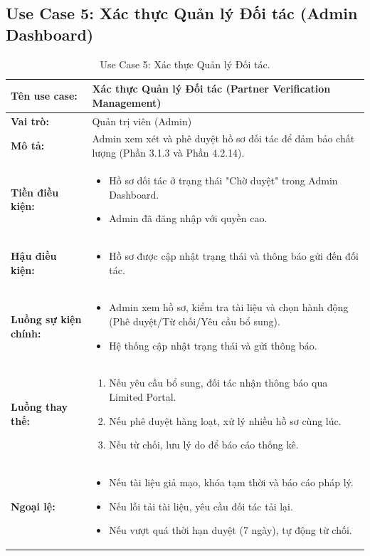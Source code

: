 \subsection{Use Case 5: Xác thực Quản lý Đối tác (Admin Dashboard)}

\begin{table}[H]
\centering
\begin{tabular}{|p{3cm}|p{12cm}|}
\hline
\textbf{Tên use case:} & Xác thực Quản lý Đối tác (Partner Verification Management) \\
\hline
\textbf{Vai trò:} & Quản trị viên (Admin) \\
\hline
\textbf{Mô tả:} & Admin xem xét và phê duyệt hồ sơ đối tác để đảm bảo chất lượng (Phần 3.1.3 và Phần 4.2.14). \\
\hline
\textbf{Tiền điều kiện:} & 
\begin{itemize}
\item Hồ sơ đối tác ở trạng thái "Chờ duyệt" trong Admin Dashboard.
\item Admin đã đăng nhập với quyền cao.
\end{itemize} \\
\hline
\textbf{Hậu điều kiện:} & 
\begin{itemize}
\item Hồ sơ được cập nhật trạng thái và thông báo gửi đến đối tác.
\end{itemize} \\
\hline
\textbf{Luồng sự kiện chính:} & 
\begin{itemize}
\item Admin xem hồ sơ, kiểm tra tài liệu và chọn hành động (Phê duyệt/Từ chối/Yêu cầu bổ sung).
\item Hệ thống cập nhật trạng thái và gửi thông báo.
\end{itemize} \\
\hline
\textbf{Luồng thay thế:} & 
\begin{enumerate}
\item[a.] Nếu yêu cầu bổ sung, đối tác nhận thông báo qua Limited Portal.
\item[b.] Nếu phê duyệt hàng loạt, xử lý nhiều hồ sơ cùng lúc.
\item[c.] Nếu từ chối, lưu lý do để báo cáo thống kê.
\end{enumerate} \\
\hline
\textbf{Ngoại lệ:} & 
\begin{itemize}
\item Nếu tài liệu giả mạo, khóa tạm thời và báo cáo pháp lý.
\item Nếu lỗi tải tài liệu, yêu cầu đối tác tải lại.
\item Nếu vượt quá thời hạn duyệt (7 ngày), tự động từ chối.
\end{itemize} \\
\hline
\end{tabular}
\caption{Use Case 5: Xác thực Quản lý Đối tác.}
\label{tab:uc5}
\end{table}
\newpage
